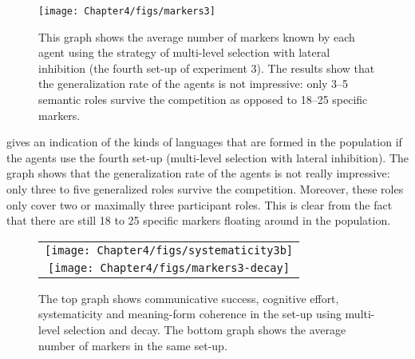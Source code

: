 \begin{figure}[b]
\centerline{\texttt{[image: Chapter4/figs/markers3]}}
  \caption[Experiment 3: number of markers]{This graph shows the average number of markers known by each agent using the strategy of multi-level selection with lateral inhibition (the fourth set-up of experiment 3). The results show that the generalization rate of the agents is not impressive: only 3--5 semantic roles survive the competition as opposed to 18--25 specific markers.}
   \label{f:markers3}
\end{figure}

 gives an indication of the kinds of languages that are formed in the population if the agents use the fourth set-up (multi-level selection with lateral inhibition). The graph shows that the generalization rate of the agents is not really impressive: only three to five generalized roles survive the competition. Moreover, these roles only cover two or maximally three participant roles. This is clear from the fact that there are still 18 to 25 specific markers floating around in the population.

\begin{figure}[p]
\centering
\begin{tabular}{c}
{\texttt{[image: Chapter4/figs/systematicity3b]}}
\\
{\texttt{[image: Chapter4/figs/markers3-decay]}}
\end{tabular}
\caption[Experiment 3: results for set-up 4]{The top graph shows communicative success, cognitive effort, systematicity and meaning-form coherence in the set-up using multi-level selection and decay. The bottom graph shows the average number of markers in the same set-up.}
\label{f:multi-level-decay}
\end{figure}

